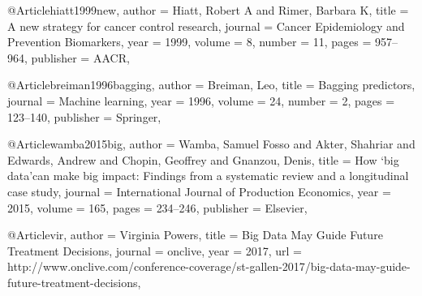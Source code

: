\documentclass[sigconf]{acmart}
\begin{document}
@Article{hiatt1999new,
  author    = {Hiatt, Robert A and Rimer, Barbara K},
  title     = {A new strategy for cancer control research},
  journal   = {Cancer Epidemiology and Prevention Biomarkers},
  year      = {1999},
  volume    = {8},
  number    = {11},
  pages     = {957--964},
  publisher = {AACR},
}

@Article{breiman1996bagging,
  author    = {Breiman, Leo},
  title     = {Bagging predictors},
  journal   = {Machine learning},
  year      = {1996},
  volume    = {24},
  number    = {2},
  pages     = {123--140},
  publisher = {Springer},
}

@Article{wamba2015big,
  author    = {Wamba, Samuel Fosso and Akter, Shahriar and Edwards, Andrew and Chopin, Geoffrey and Gnanzou, Denis},
  title     = {How ‘big data’can make big impact: Findings from a systematic review and a longitudinal case study},
  journal   = {International Journal of Production Economics},
  year      = {2015},
  volume    = {165},
  pages     = {234--246},
  publisher = {Elsevier},
}

@Article{vir,
  author  = {Virginia Powers},
  title   = {Big Data May Guide Future Treatment Decisions},
  journal = {onclive},
  year    = {2017},
  url     = {http://www.onclive.com/conference-coverage/st-gallen-2017/big-data-may-guide-future-treatment-decisions},
}
\end{document}
